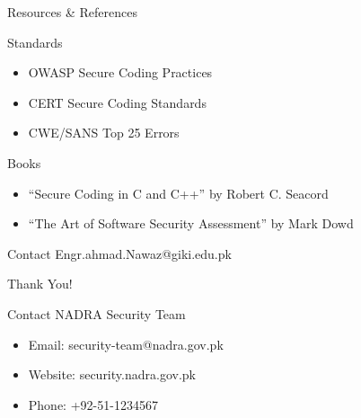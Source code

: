 \documentclass[12pt]{beamer}
\begin{document}
\begin{frame}{Resources \& References}
  \begin{block}{Standards}
    \begin{itemize}
      \item OWASP Secure Coding Practices
      \item CERT Secure Coding Standards
      \item CWE/SANS Top 25 Errors
    \end{itemize}
  \end{block}
  \begin{block}{Books}
    \begin{itemize}
      \item ``Secure Coding in C and C++'' by Robert C. Seacord
      \item ``The Art of Software Security Assessment'' by Mark Dowd
    \end{itemize}
  \end{block}
  \begin{block}{Contact}
    Engr.ahmad.Nawaz@giki.edu.pk
  \end{block}
\end{frame}

\begin{frame}{Thank You!}
  \begin{block}{Contact NADRA Security Team}
    \begin{itemize}
      \item Email: security-team@nadra.gov.pk
      \item Website: security.nadra.gov.pk
      \item Phone: +92-51-1234567
    \end{itemize}
  \end{block}
\end{frame}

\end{document}
